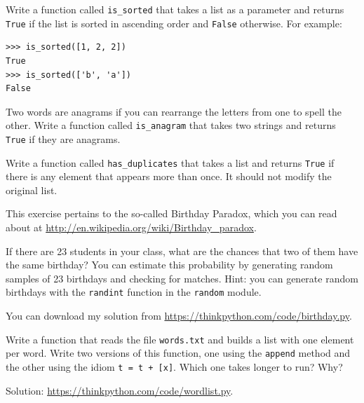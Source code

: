 \documentclass[10pt]{book}
\begin{document}
\begin{exercise}
Write a function called \verb"is_sorted" that takes a list as a
parameter and returns {\tt True} if the list is sorted in ascending
order and {\tt False} otherwise.  For example:

\begin{verbatim}
>>> is_sorted([1, 2, 2])
True
>>> is_sorted(['b', 'a'])
False
\end{verbatim}

\end{exercise}


\begin{exercise}
\label{anagram}

Two words are anagrams if you can rearrange the letters from one
to spell the other.  Write a function called \verb"is_anagram"
that takes two strings and returns {\tt True} if they are anagrams.
\end{exercise}



\begin{exercise}
\label{duplicate}

Write a function called \verb"has_duplicates" that takes
a list and returns {\tt True} if there is any element that
appears more than once.  It should not modify the original
list.

\end{exercise}


\begin{exercise}

This exercise pertains to the so-called Birthday Paradox, which you
can read about at \url{http://en.wikipedia.org/wiki/Birthday_paradox}.

If there are 23 students in your class, what are the chances
that two of them have the same birthday?  You can estimate this
probability by generating random samples of 23 birthdays
and checking for matches.  Hint: you can generate random birthdays
with the {\tt randint} function in the {\tt random} module.

You can download my
solution from \url{https://thinkpython.com/code/birthday.py}.

\end{exercise}



\begin{exercise}

Write a function that reads the file {\tt words.txt} and builds
a list with one element per word.  Write two versions of
this function, one using the {\tt append} method and the
other using the idiom {\tt t = t + [x]}.  Which one takes
longer to run?  Why?

Solution: \url{https://thinkpython.com/code/wordlist.py}.

\end{exercise}
\end{document}
